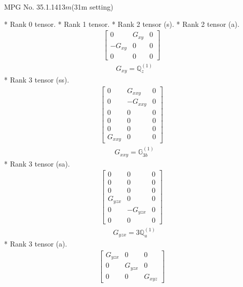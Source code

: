 \documentclass[fleqn,8pt,landscape]{jsarticle}
\begin{document}
\setcounter{MaxMatrixCols}{32}

\renewcommand{\tablename}{Table~}
\renewcommand{\figurename}{Figure~}
\begin{center}
\LARGE
MPG No. 35.1.141\quad$3m$\quad(31m setting)
\end{center}
* Rank 0 tensor.
* Rank 1 tensor.
* Rank 2 tensor (s).
* Rank 2 tensor (a).
\begin{align*}
\begin{bmatrix} 0 & G_{xy} & 0 \\ - G_{xy} & 0 & 0 \\ 0 & 0 & 0 \end{bmatrix}
\end{align*}
\begin{align*}
& G_{xy} = \mathbb{Q}_{z}^{(1)}
\end{align*}
* Rank 3 tensor (ss).
\begin{align*}
\begin{bmatrix} 0 & G_{xxy} & 0 \\ 0 & - G_{xxy} & 0 \\ 0 & 0 & 0 \\ 0 & 0 & 0 \\ 0 & 0 & 0 \\ G_{xxy} & 0 & 0 \end{bmatrix}
\end{align*}
\begin{align*}
& G_{xxy} = \mathbb{G}_{3b}^{(1)}
\end{align*}
* Rank 3 tensor (sa).
\begin{align*}
\begin{bmatrix} 0 & 0 & 0 \\ 0 & 0 & 0 \\ 0 & 0 & 0 \\ G_{yzx} & 0 & 0 \\ 0 & - G_{yzx} & 0 \\ 0 & 0 & 0 \end{bmatrix}
\end{align*}
\begin{align*}
& G_{yzx} = 3 \mathbb{Q}_{u}^{(1)}
\end{align*}
* Rank 3 tensor (a).
\begin{align*}
\begin{bmatrix} G_{yzx} & 0 & 0 \\ 0 & G_{yzx} & 0 \\ 0 & 0 & G_{xyz} \end{bmatrix}
\end{align*}
\end{document}
